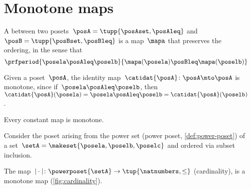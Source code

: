 
\section{Monotone maps}
\label{sec:monotonicity-monotone-maps}



\begin{definition}
    \label{def:monotone}
    A \emph{} between two posets~$\posA=\tupp{\posAset, \posAleq}$ and~$\posB=\tupp{\posBset, \posBleq}$ is a map~$\mapa$ that preserves the ordering, in the sense that
    \begin{equation}
        \prfperiod{
            \posela \posAleq \poselb
        }{
            \mapa(\posela) \posBleq \mapa(\poselb)
        }
    \end{equation}
\end{definition}

\begin{example}
    Given a poset~$\posA$, the identity map~$\catidat{\posA}\colon \posA \mto \posA$ is monotone, since if~$\posela\posAleq \poselb$, then~$\catidat{\posA}(\posela)=\posela \posAleq  \poselb =  \catidat{\posA}(\poselb )$.
\end{example}

\begin{example}
    Every constant map is monotone.
\end{example}

\begin{example}
    Consider the poset arising from the power set (power poset, \cref{def:power-poset}) of a set~$\setA=\makeset{\posela,\poselb,\poselc}$ and ordered via subset inclusion.

    The map~$\vert \cdot \vert \colon \powerposet{\setA} \to \tup{\natnumbers,\leq}$ (cardinality), is a monotone map (\cref{fig:cardinality}).
    \begin{figure*}[h!]
        \centering
        \caption{The cardinality map is a monotone map. }
        \label{fig:cardinality}
    \end{figure*}
\end{example}

